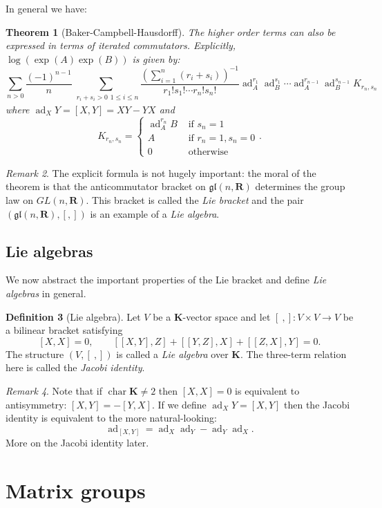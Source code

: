 \documentclass[12pt]{article}
\newcommand{\RR}{\mathbf{R}}
\newcommand{\KK}{\mathbf{K}}
\newcommand{\OP}{\operatorname}
\newcommand{\ad}{\OP{ad}}
\newtheorem{thm}{Theorem}[section]
\theoremstyle{definition}
\newtheorem{dfn}[thm]{Definition}
\theoremstyle{check}
\theoremstyle{remark}
\newtheorem{rmk}[thm]{Remark}
\theoremstyle{TheoremNum}
\begin{document}
In general we have:
\begin{thm}[Baker-Campbell-Hausdorff]
The higher order terms can also be expressed in terms of iterated commutators. Explicitly, $\log(\exp(A)\exp(B))$ is given by:
\[\sum_{n>0}\frac{(-1)^{n-1}}{n}\sum_{\substack{r_i+s_i>0}{1\leq i\leq n}}\frac{(\sum_{i=1}^n(r_i+s_i))^{-1}}{r_1!s_1!\cdots r_n!s_n!}\ad_A^{r_1}\ad_B^{s_1}\cdots\ad_A^{r_{n-1}}\ad_B^{s_{n-1}}K_{r_n,s_n}\]
where $\ad_XY=[X,Y]=XY-YX$ and
\[K_{r_n,s_n}=\begin{cases}\ad_A^{r_n}B&\mbox{ if }s_n=1\\
A&\mbox{ if }r_n=1,s_n=0\\
0 &\mbox{ otherwise}\end{cases}.\]
\end{thm}

\begin{rmk}
The explicit formula is not hugely important: the moral of the theorem is that the anticommutator bracket on $\mathfrak{gl}(n,\RR)$ determines the group law on $GL(n,\RR)$. This bracket is called the {\em Lie bracket} and the pair $(\mathfrak{gl}(n,\RR),[,])$ is an example of a {\em Lie algebra}.
\end{rmk}

\subsection{Lie algebras}

We now abstract the important properties of the Lie bracket and define {\em Lie algebras} in general.

\begin{dfn}[Lie algebra]
Let $V$ be a $\KK$-vector space and let $[\ ,]\colon V\times V\to V$ be a bilinear bracket satisfying
\[[X,X]=0,\qquad[[X,Y],Z]+[[Y,Z],X]+[[Z,X],Y]=0.\]
The structure $(V,[\ ,])$ is called a {\em Lie algebra} over $\KK$. The three-term relation here is called the {\em Jacobi identity}.
\end{dfn}
\begin{rmk}
Note that if $\OP{char}\KK\neq 2$ then $[X,X]=0$ is equivalent to antisymmetry: $[X,Y]=-[Y,X]$. If we define $\ad_XY=[X,Y]$ then the Jacobi identity is equivalent to the more natural-looking:
\[\ad_{[X,Y]}=\ad_X\ad_Y-\ad_Y\ad_X.\]
More on the Jacobi identity later.
\end{rmk}


\section{Matrix groups}
\end{document}
